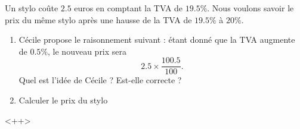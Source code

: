 
\begin{exercice}\label{exosmath-0136}

    Un stylo coûte \( 2.5\) euros en comptant la TVA de \( 19.5\%\). Nous voulons savoir le prix du même stylo après une hausse de la TVA de \( 19.5\%\) à \( 20\%\).
    \begin{enumerate}
        \item
            Cécile propose le raisonnement suivant : étant donné que la TVA augmente de \( 0.5\%\), le nouveau prix sera
            \begin{equation}
                2.5\times\frac{ 100.5 }{ 100 }.
            \end{equation}
            Quel est l'idée de Cécile ? Est-elle correcte ?
        \item
            Calculer le prix du stylo 
    \end{enumerate}
    <++>



\end{exercice}
